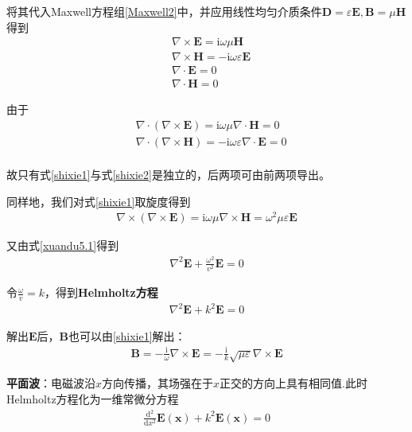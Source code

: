 \documentclass[main.tex]{subfiles}
\begin{document}
将其代入Maxwell方程组\ref{Maxwell2}中，并应用线性均匀介质条件$\boldsymbol{D} = \varepsilon \boldsymbol{E}, \boldsymbol{B} = \mu \boldsymbol{H}$得到
\begin{align}
    \label{shixie1}&\nabla \times \boldsymbol{E} = \mathrm{i} \omega \mu \boldsymbol{H}\\
    \label{shixie2}&\nabla \times \boldsymbol{H} = -\mathrm{i}\omega \varepsilon \boldsymbol{E}\\
    &\nabla \cdot \boldsymbol{E} = 0\\
    &\nabla \cdot \boldsymbol{H} = 0
\end{align}

由于
\begin{align}
    &\nabla \cdot (\nabla \times \boldsymbol{E} )= \mathrm{i} \omega \mu \nabla \cdot \boldsymbol{H} = 0\\
    &\nabla \cdot (\nabla \times \boldsymbol{H}) = -\mathrm{i}\omega \varepsilon \nabla \cdot \boldsymbol{E} = 0\\
\end{align}

故只有式\ref{shixie1}与式\ref{shixie2}是独立的，后两项可由前两项导出。

同样地，我们对式\ref{shixie1}取旋度得到
\begin{align}
    \nabla \times (\nabla \times \boldsymbol{E}) = \mathrm{i}\omega \mu \nabla \times \boldsymbol{H} = \omega ^2 \mu \varepsilon \boldsymbol{E}
\end{align}

又由式\ref{xuandu5.1}得到
\begin{align}
    \nabla ^2 \boldsymbol{E} + \frac{\omega ^2}{v^2}\boldsymbol{E} = 0
\end{align}

令$\displaystyle \frac{\omega }{v} = k$，得到\textbf{Helmholtz方程}
\begin{align}
    \nabla ^2 \boldsymbol{E} +k^2 \boldsymbol{E} = 0
\end{align}

解出$\boldsymbol{E}$后，$\boldsymbol{B}$也可以由\ref{shixie1}解出：
\begin{align}
    \boldsymbol{B} = -\frac{\mathrm{i}}{\omega}\nabla \times \boldsymbol{E} = -\frac{\mathrm{i}}{k}\sqrt{\mu \varepsilon}\nabla \times \boldsymbol{E}
\end{align}

\textbf{平面波}：电磁波沿$x$方向传播，其场强在于$x$正交的方向上具有相同值.此时Helmholtz方程化为一维常微分方程
\begin{align}
    \frac{\mathrm{d}^2}{\mathrm{d} x^2}\boldsymbol{E}(\boldsymbol{x})+k^2 \boldsymbol{E}(\boldsymbol{x}) = 0
\end{align}
\end{document}
